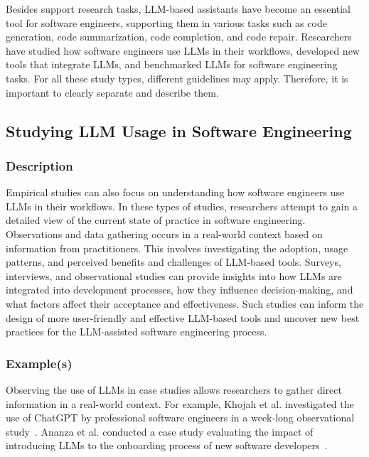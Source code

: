 \documentclass[11pt]{article}
\begin{document}
Besides support research tasks, LLM-based assistants have become an essential tool for software engineers, supporting them in various tasks such as code generation, code summarization, code completion, and code repair.
Researchers have studied how software engineers use LLMs in their workflows, developed new tools that integrate LLMs, and benchmarked LLMs for software engineering tasks.
For all these study types, different guidelines may apply.
Therefore, it is important to clearly separate and describe them. 

\subsection{Studying LLM Usage in Software Engineering}

\subsubsection{Description}

Empirical studies can also focus on understanding how software engineers use LLMs in their workflows.
In these types of studies, researchers attempt to gain a detailed view of the current state of practice in software engineering.
Observations and data gathering occurs in a real-world context based on information from practitioners.
This involves investigating the adoption, usage patterns, and perceived benefits and challenges of LLM-based tools. 
Surveys, interviews, and observational studies can provide insights into how LLMs are integrated into development processes, how they influence decision-making, and what factors affect their acceptance and effectiveness. 
Such studies can inform the design of more user-friendly and effective LLM-based tools and uncover new best practices for the LLM-assisted software engineering process.

\subsubsection{Example(s)}

Observing the use of LLMs in case studies allows researchers to gather direct information in a real-world context.
For example, Khojah et al. investigated the use of ChatGPT by professional software engineers in a week-long observational study~\cite{DBLP:journals/pacmse/KhojahM0N24}.
Ananza et al. conducted a case study evaluating the impact of introducing LLMs to the onboarding process of new software developers~\cite{DBLP:conf/csee/AzanzaPIG24}.
\end{document}
